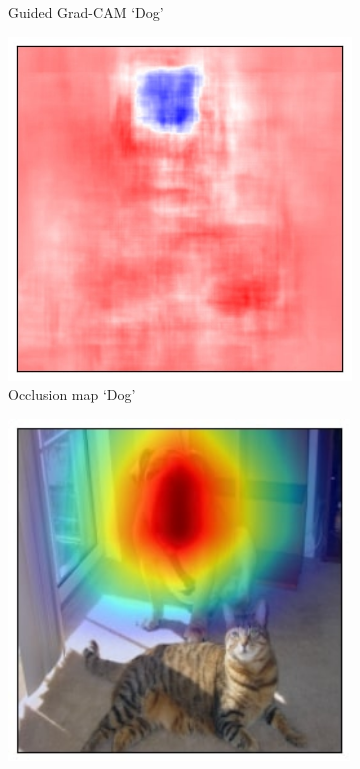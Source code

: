 \begin{figure}[t!]
\begin{subfigure}[t]{0.161\textwidth}
        \caption{\hspace{-1.9pt}\scriptsize{Guided Grad-CAM `Dog'}\hspace{-12pt}}
        \label{fig:teaser_gbgcam_dog}
	\end{subfigure}
	\begin{subfigure}[t]{0.161\textwidth}
		\centering
        \includegraphics[width=\textwidth]{figures/teaser/dog_occlusion.jpg}
        \caption{\scriptsize{Occlusion map `Dog'}\hspace{-12pt}}
        \label{fig:teaser_dog_occlusion}
	\end{subfigure}
	\begin{subfigure}[t]{0.161\textwidth}
		\centering
		\includegraphics[width=0.995\textwidth]{figures/gcam_res18_243.jpg}

\end{subfigure}
\end{figure}
